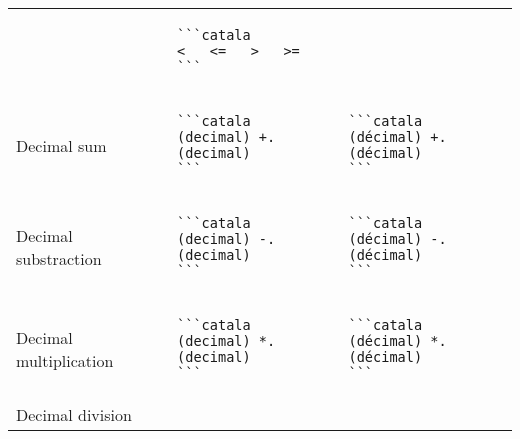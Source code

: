 \documentclass[a3paper,landscape]{article}
\begin{document}
\begin{multicols*}{2}
\begin{center}
\begin{tabular}{p{}p{}p{}}
                                      &
      \vspace*{-1.75em}
      \begin{verbatim}
```catala
<   <=   >   >=
```
\end{verbatim}
      \vspace*{-1.75em}
      \\
      Decimal sum                     &
      \vspace*{-1.75em}
      \begin{verbatim}
```catala
(decimal) +. (decimal)
```
\end{verbatim}
      \vspace*{-1.75em}
                                      &
      \vspace*{-1.75em}
      \begin{verbatim}
```catala
(décimal) +. (décimal)
```
\end{verbatim}
      \vspace*{-1.75em}
      \\
      Decimal substraction            &
      \vspace*{-1.75em}
      \begin{verbatim}
```catala
(decimal) -. (decimal)
```
\end{verbatim}
      \vspace*{-1.75em}
                                      &
      \vspace*{-1.75em}
      \begin{verbatim}
```catala
(décimal) -. (décimal)
```
\end{verbatim}
      \vspace*{-1.75em}
      \\
      Decimal multiplication          &
      \vspace*{-1.75em}
      \begin{verbatim}
```catala
(decimal) *. (decimal)
```
\end{verbatim}
      \vspace*{-1.75em}
                                      &
      \vspace*{-1.75em}
      \begin{verbatim}
```catala
(décimal) *. (décimal)
```
\end{verbatim}
      \vspace*{-1.75em}
      \\
      Decimal division                &
      \vspace*{-1.75em}

\end{tabular}
\end{center}
\end{multicols*}
\end{document}
